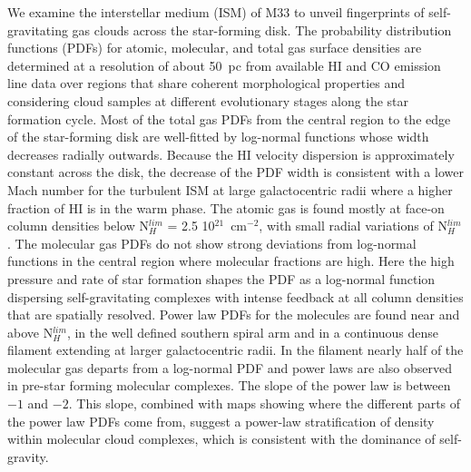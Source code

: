 \documentclass{aa}
\begin{document}
 \abstract
   {}
   { We examine the interstellar medium (ISM) of M33 to unveil fingerprints of self-gravitating
   gas  clouds across the star-forming disk.  }
   {The probability distribution functions (PDFs) for atomic, molecular, and total gas surface densities
    are determined at a resolution of about 50~pc from available HI and CO  emission line data  
   over regions that share coherent morphological properties and considering cloud samples at different evolutionary 
   stages along the star formation cycle. }
   {Most of the total gas PDFs from the central region to the edge of the star-forming disk
   are well-fitted by log-normal functions whose width decreases radially outwards. Because the HI
   velocity dispersion is approximately constant across the disk, the decrease of the PDF width is consistent  
   with a lower Mach number for the turbulent ISM at large galactocentric radii where a higher fraction 
   of HI is in the warm phase.  The atomic gas  
   is found mostly at face-on column densities below N$_{H}^{lim}$ = 2.5 10$^{21}$~cm$^{-2}$, 
   with small radial variations of N$_{H}^{lim}$.
   The molecular gas PDFs do not show strong deviations from log-normal functions in the
   central region where molecular fractions are high. Here the high pressure and rate of star formation
   shapes the  PDF as a log-normal function  dispersing self-gravitating complexes with intense feedback
   at all column densities that are spatially resolved.
   Power law PDFs for the molecules are found  near and above N$_H^{lim}$,
   in the well defined southern spiral arm and in a continuous dense filament extending  at larger
   galactocentric radii. In the filament nearly half of the molecular gas departs from a log-normal PDF and power laws 
   are also observed in pre-star forming molecular complexes.
   The slope of the power law is between $-1$ and $-2$. This slope, combined with
   maps showing where the different parts of the power law PDFs come from, suggest a
   power-law stratification of density within molecular cloud complexes, which is consistent with the dominance
   of self-gravity.}
  {}

   \maketitle
\end{document}

